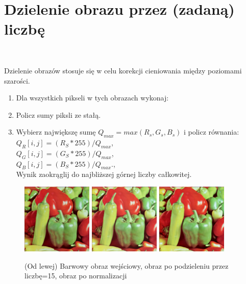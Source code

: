 \documentclass[final,a4paper,openany,12pt]{mwbk}
\begin{document}
\section{ Dzielenie obrazu przez (zadaną) liczbę}

\hfill\\
\indent

Dzielenie obrazów stosuje się w celu korekcji cieniowania między poziomami szarości.

\begin{enumerate}	
		
		\item Dla wszystkich pikseli w tych obrazach wykonaj:
		\item Policz sumy piksli ze stałą.
		\item Wybierz największę sumę  $Q_{max} = max(R_{s}, G_{s}, B_{s})$ i policz równania:\\
		$Q_{R}[i,j] = (R_{S} * 255)/Q_{max}$,\\
		$Q_{G}[i,j] = (G_{S} * 255)/Q_{max}$,\\
		$Q_{B}[i,j] = (B_{S} * 255)/Q_{max}$.,\\
		Wynik zaokrąglij do najbliższej górnej liczby całkowitej.
	\end{enumerate}

\begin{figure}[H]
	\begin{center}
		\includegraphics[width=0.3\textwidth]{1/1Color_Div_Original}
		\includegraphics[width=0.3\textwidth]{1/1Color_Div_Result}
		\includegraphics[width=0.3\textwidth]{1/1Color_Div_Result_Norm}
	\end{center}
	\caption{(Od lewej) Barwowy obraz wejściowy, obraz po podzieleniu przez liczbę=15, obraz po normalizacji }
\end{figure}
\end{document}
